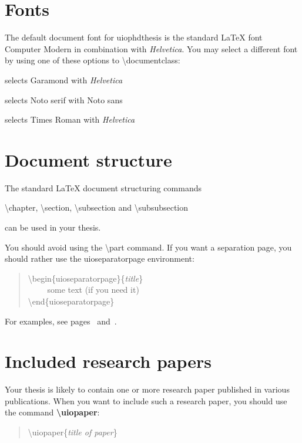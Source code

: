 \documentclass[UKenglish]{uiophdthesis}
\newcommand{\bsl}{\textbackslash}
\newcommand{\tettere}{\addtolength{\itemsep}{-1ex}}
\newcommand{\p}[1]{\textsf{#1}}
\newcommand{\pcmd}[1]{\p{\bsl #1}}
\newcommand{\ppar}[1]{\p{\{#1\}}}
\begin{document}
\section{Fonts\label{font}}
The default document font for \p{uiophdthesis} is the standard \LaTeX{} font
{\selectfont Computer Modern} in
combination with \textsf{\textit{Helvetica}}.
You may select a different font by using one of these
options to \pcmd{documentclass}:
\begin{description}\tettere
\item[\p{font=garamond}] selects
  {\selectfont Garamond} with
  \textsf{\textit{Helvetica}}
  
\item[\p{font=noto}] selects
  {\selectfont Noto serif} with
  {\selectfont Noto sans}

\item[\p{font=times}] selects
  {\selectfont Times Roman} with
  \textsf{\textit{Helvetica}}
\end{description}

\section{Document structure}
The standard \LaTeX{} document structuring commands
\begin{center}
  \pcmd{chapter}, \pcmd{section}, \pcmd{subsection} and \pcmd{subsubsection}
\end{center}
can be used in your thesis.

You should avoid using the \pcmd{part} command. If you want a
separation page, you should rather use the \p{uioseparatorpage}
environment:

\begin{quote}
  \pcmd{begin}\ppar{uioseparatorpage}\ppar{\emph{title}}\\
  ~~~~ some text (if you need it)\\
  \pcmd{end}\ppar{uioseparatorpage}
\end{quote}
For examples, see pages~\pageref{intro-part} and~\pageref{info-part}.

\section{Included research papers}
Your thesis is likely to contain one or more research paper published
in various publications. When you want to include such a research
paper, you should use the command \textbf{\pcmd{uiopaper}}:
\begin{quote}
  \pcmd{uiopaper}\ppar{\emph{title of paper}}
\end{quote}
\end{document}
